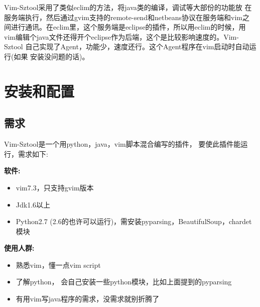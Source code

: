 \documentclass[oneside,openany]{book}
\begin{document}
  Vim-Sztool采用了类似eclim的方法，将java类的编译，调试等大部份的功能放
在服务端执行，然后通过gvim支持的remote-send和netbeans协议在服务端和vim之
间进行通讯。在eclim里，这个服务端是eclipse的插件，所以用eclim的时候，用
vim编辑个java文件还得开个eclipse作为后端，这个是比较影响速度的。Vim-Sztool
自己实现了Agent，功能少，速度还行。这个Agent程序在vim启动时自动运行(如果
安装没问题的话)。

\chapter{安装和配置}
  \section{需求}
  Vim-Sztool是一个用python，java，vim脚本混合编写的插件， 要使此插件能运行，需求如下:

  \textbf{软件:}
    \begin{itemize}
      \item vim7.3，只支持gvim版本
      \item Jdk1.6以上
      \item Python2.7 (2.6的也许可以运行)，需安装pyparsing，BeautifulSoup，chardet模块
    \end{itemize}

  \textbf{使用人群:}
    \begin{itemize}
      \item 熟悉vim，懂一点vim script
      \item 了解python， 会自己安装一些python模块，比如上面提到的pyparsing
      \item 有用vim写java程序的需求，没需求就别折腾了
    \end{itemize}
\end{document}
